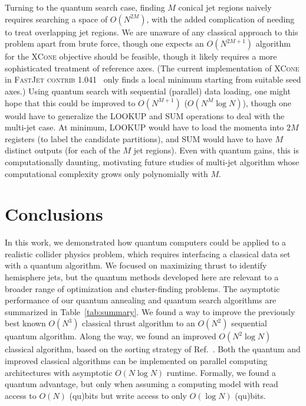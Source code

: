 \documentclass[aps,prd,twocolumn,superscriptaddress,preprintnumbers,nofootinbib,longbibliography,floatfix]{revtex4-1}
\DeclareRobustCommand{\Tab}[1]{Table~\ref{#1}}
\DeclareRobustCommand{\Ref}[1]{Ref.~\cite{#1}}
\begin{document}
Turning to the quantum search case, finding $M$ conical jet regions naively requires searching a space of $O(N^{2M})$, with the added complication of needing to treat overlapping jet regions.
%
We are unaware of any classical approach to this problem apart from brute force, though one expects an $O(N^{2M+1})$ algorithm for the \textsc{XCone} objective should be feasible, though it likely requires a more sophisticated treatment of reference axes.
%
(The current implementation of \textsc{XCone} in \textsc{FastJet contrib} 1.041~\cite{Cacciari:2011ma,fjcontrib} only finds a local minimum starting from suitable seed axes.)
%
Using quantum search with sequential (parallel) data loading, one might hope that this could be improved to $O(N^{M+1})$ ($O(N^M \log N)$), though one would have to generalize the LOOKUP and SUM operations to deal with the multi-jet case.
%
At minimum, LOOKUP would have to load the momenta into $2M$ registers (to label the candidate partitions), and SUM would have to have $M$ distinct outputs (for each of the $M$ jet regions).
%
Even with quantum gains, this is computationally daunting, motivating future studies of multi-jet algorithm whose computational complexity grows only polynomially with $M$.



%
%

\section{Conclusions}
\label{sec:conclude}


In this work, we demonstrated how quantum computers could be applied to a realistic collider physics problem, which requires interfacing a classical data set with a quantum algorithm.
%
We focused on maximizing thrust to identify hemisphere jets, but the quantum methods developed here are relevant to a broader range of optimization and cluster-finding problems.
%
The asymptotic performance of our quantum annealing and quantum search algorithms are summarized in \Tab{tab:summary}.
%
We found a way to improve the previously best known $O(N^3)$ classical thrust algorithm to an $O(N^2)$ sequential quantum algorithm.
%
Along the way, we found an improved $O(N^2 \log N)$ classical algorithm, based on the sorting strategy of \Ref{Salam:2007xv}.
%
Both the quantum and improved classical algorithms can be implemented on parallel computing architectures with asymptotic $O(N \log N)$ runtime.
%
Formally, we found a quantum advantage, but only when assuming a computing model with read access to $O(N)$ (qu)bits but write access to only $O(\log N)$ (qu)bits.
\end{document}

